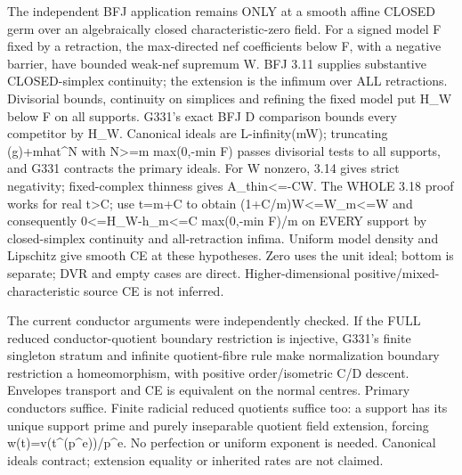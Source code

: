 The independent BFJ application remains ONLY at a smooth affine CLOSED germ over an algebraically closed characteristic-zero field. For a signed model F fixed by a retraction, the max-directed nef coefficients below F, with a negative barrier, have bounded weak-nef supremum W. BFJ 3.11 supplies substantive CLOSED-simplex continuity; the extension is the infimum over ALL retractions. Divisorial bounds, continuity on simplices and refining the fixed model put H\_W below F on all supports. G331's exact BFJ D comparison bounds every competitor by H\_W. Canonical ideals are L-infinity(mW); truncating (g)+mhat\textasciicircum{}N with N\textgreater{}=m max(0,-min F) passes divisorial tests to all supports, and G331 contracts the primary ideals. For W nonzero, 3.14 gives strict negativity; fixed-complex thinness gives A\_thin\textless{}=-CW. The WHOLE 3.18 proof works for real t\textgreater{}C; use t=m+C to obtain (1+C/m)W\textless{}=W\_m\textless{}=W and consequently 0\textless{}=H\_W-h\_m\textless{}=C max(0,-min F)/m on EVERY support by closed-simplex continuity and all-retraction infima. Uniform model density and Lipschitz give smooth CE at these hypotheses. Zero uses the unit ideal; bottom is separate; DVR and empty cases are direct. Higher-dimensional positive/mixed-characteristic source CE is not inferred.

The current conductor arguments were independently checked. If the FULL reduced conductor-quotient boundary restriction is injective, G331's finite singleton stratum and infinite quotient-fibre rule make normalization boundary restriction a homeomorphism, with positive order/isometric C/D descent. Envelopes transport and CE is equivalent on the normal centres. Primary conductors suffice. Finite radicial reduced quotients suffice too: a support has its unique support prime and purely inseparable quotient field extension, forcing w(t)=v(t\textasciicircum{}(p\textasciicircum{}e))/p\textasciicircum{}e. No perfection or uniform exponent is needed. Canonical ideals contract; extension equality or inherited rates are not claimed.

